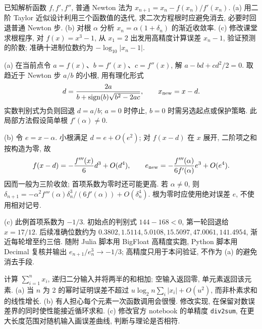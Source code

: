 \begin{exercise}\label{ps1:q3}
已知解析函数 $f,f',f''$, 普通 Newton 法为 $x_{n+1}=x_n-f(x_n)/f'(x_n)$.
(a) 用二阶 Taylor 近似设计利用三个函数值的迭代, 求二次方程根时应避免消去, 必要时回退普通 Newton 步.
(b) 对根 $\alpha$ 分析 $x_n=\alpha(1+\delta_n)$ 的渐近收敛率.
(c) 修改课堂求根程序, 对 $f(x)=x^3-1$, 从 $x_1=2$ 出发用高精度计算误差 $x_n-1$, 验证预测的阶数; 准确十进制位数约为 $-\log_{10}|x_n-1|$.
\end{exercise}
\begin{solution}
(a) 在当前点令 $a=f(x)$、$b=f'(x)$、$c=f''(x)$, 解 $a-bd+cd^2/2=0$. 取趋近于 Newton 步 $a/b$ 的小根, 用有理化形式
\[
 d=\frac{2a}{b+\operatorname{sign}(b)\sqrt{b^2-2ac}},\qquad x_{\rm new}=x-d.
\]
实数判别式为负则回退 $d=a/b$; $a=0$ 时停止, $b=0$ 时需另选起点或保护策略. 此局部方法假设简单根 $f'(\alpha)\ne0$.

(b) 令 $e=x-\alpha$. 小根满足 $d=e+O(e^2)$; 对 $f(x-d)$ 在 $x$ 展开, 二阶项之和按构造为零, 故
\[
 f(x-d)=-\frac{f'''(x)}6d^3+O(d^4),\qquad
 e_{\rm new}=-\frac{f'''(\alpha)}{6f'(\alpha)}e^3+O(e^4).
\]
因而一般为三阶收敛; 首项系数为零时还可能更高. 若 $\alpha\ne0$, 则 $\delta_{n+1}=-\alpha^2 f'''(\alpha)\delta_n^3/(6f'(\alpha))+O(\delta_n^4)$. 根为零时应使用绝对误差 $e$, 不使用相对记号.

(c) 此例首项系数为 $-1/3$. 初始点的判别式 $144-168<0$, 第一轮回退给 $x=17/12$. 后续准确位数约为 $0.3802,1.5114,5.0108,15.5097,47.0061,141.4954$, 渐近每轮增至约三倍. 随附 Julia 脚本用 BigFloat 高精度实跑, Python 脚本用 Decimal 复核并输出 $e_{n+1}/e_n^3\to-1/3$; 高精度只用于本问验证, 不作为 (a) 的避免消去手段.
\end{solution}
\begin{exercise}\label{ps1:q4}
计算 $\sum_{i=1}^n x_i$, 递归二分输入并将两半的和相加; 空输入返回零, 单元素返回该元素.
(a) 当 $n$ 为 2 的幂时证明误差不超过 $u\log_2n\sum_i|x_i|+O(u^2)$, 而非朴素求和的线性增长.
(b) 有人担心每个元素一次函数调用会很慢. 修改实现, 在保留对数误差界的同时使性能接近循环求和.
(c) 修改官方 notebook 的单精度 \texttt{div2sum}, 在更大长度范围对随机输入画误差曲线, 判断与理论是否相符.
\end{exercise}
